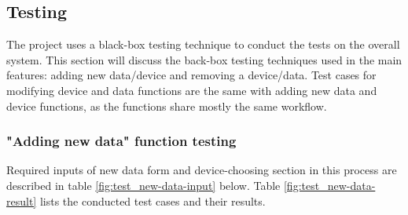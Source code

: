 \documentclass[../Main.tex]{subfiles}
\begin{document}
\subsection{Testing}
The project uses a black-box testing technique to conduct the tests on the overall system. This section will discuss the back-box testing techniques used in the main features: adding new data/device and removing a device/data. Test cases for modifying device and data functions are the same with adding new data and device functions, as the functions share mostly the same workflow. 

\subsubsection{"Adding new data" function testing}
Required inputs of new data form and device-choosing section in this process are described in table \ref{fig:test_new-data-input} below. Table \ref{fig:test_new-data-result} lists the conducted test cases and their results. 
\end{document}
